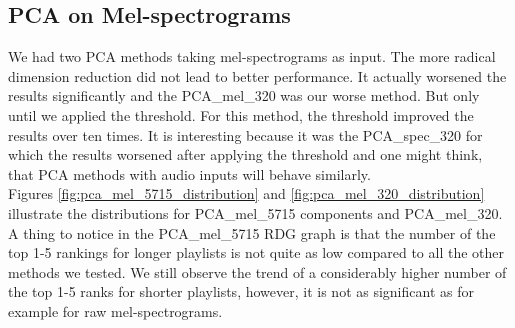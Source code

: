 \subsection{PCA on Mel-spectrograms}\label{ssec:pca_mel_results}

We had two PCA methods taking mel-spectrograms as input. The more radical dimension reduction did not lead to better performance. It actually worsened the results significantly and the PCA\_mel\_320 was our worse method. But only until we applied the threshold. For this method, the threshold improved the results over ten times. It is interesting because it was the PCA\_spec\_320 for which the results worsened after applying the threshold and one might think, that PCA methods with audio inputs will behave similarly.\\
Figures \ref{fig:pca_mel_5715_distribution} and \ref{fig:pca_mel_320_distribution} illustrate the distributions for PCA\_mel\_5715 components and PCA\_mel\_320. A thing to notice in the PCA\_mel\_{5715} RDG graph is that the number of the top 1-5 rankings for longer playlists is not quite as low compared to all the other methods we tested. We still observe the trend of a considerably higher number of the top 1-5 ranks for shorter playlists, however, it is not as significant as for example for raw mel-spectrograms.
